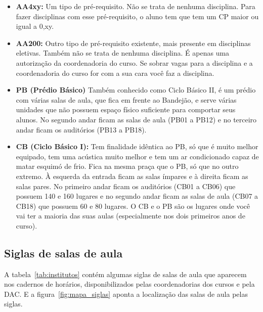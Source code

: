 \begin{itemize}
\item  \textbf{AA4xy:} Um tipo de pré-requisito. Não se trata de nenhuma disciplina. Para fazer disciplinas com esse pré-requisito, o aluno tem que tem um CP maior ou igual a 0,xy.
\end{itemize}

\begin{itemize}
\item  \textbf{AA200:} Outro tipo de pré-requisito existente, mais presente em disciplinas eletivas. Também não se trata de nenhuma disciplina. É apenas uma autorização da coordenadoria do curso. Se sobrar vagas para a disciplina e a coordenadoria do curso for com a sua cara você faz a disciplina.
\end{itemize}

\begin{itemize}
\item  \textbf{PB (Prédio Básico)} Também conhecido como Ciclo Básico II, é um prédio com várias salas de aula, que fica em frente ao Bandejão, e serve várias unidades que não possuem espaço físico suficiente para comportar seus alunos. No segundo andar ficam as salas de aula (PB01 a PB12) e no terceiro andar ficam os auditórios (PB13 a PB18).
\end{itemize}

\begin{itemize}
\item  \textbf{CB (Ciclo Básico I):} Tem finalidade idêntica ao PB, só que é muito melhor equipado, tem uma acústica muito melhor e tem um ar condicionado capaz de matar esquimó de frio. Fica na mesma praça que o PB, só que no outro extremo. À esquerda da entrada ficam as salas ímpares e à direita ficam as salas pares. No primeiro andar ficam os auditórios (CB01 a CB06) que possuem 140 e 160 lugares e no segundo andar ficam as salas de aula (CB07 a CB18) que possuem 60 e 80 lugares.  O CB e o PB são os lugares onde você vai ter a maioria das suas aulas (especialmente nos dois primeiros anos de curso).
\end{itemize}

\subsection{Siglas de salas de aula}

A tabela~\ref{tab:institutos} contém algumas siglas de salas de aula que aparecem nos cadernos
de horários, disponibilizados pelas coordenadorias dos cursos e pela DAC. E a figura~\ref{fig:mapa_siglas} aponta a localização das salas de aula pelas siglas.

